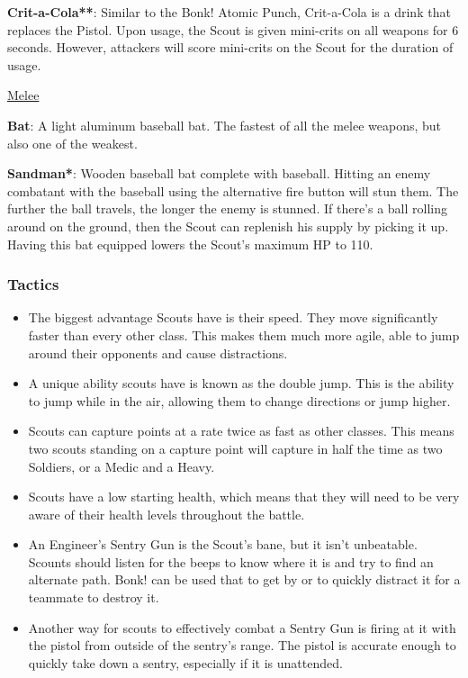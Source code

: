 {\bf Crit-a-Cola**}: Similar to the Bonk! Atomic Punch, Crit-a-Cola is a drink that replaces the Pistol.  Upon usage, the Scout is given mini-crits on all weapons for 6 seconds.  However, attackers will score mini-crits on the Scout for the duration of usage.

\newpage


\begin {center}
\underline {Melee}
\end {center}

{\bf Bat}: A light aluminum baseball bat. The fastest of all the melee weapons, but also one of the weakest.

{\bf Sandman*}: Wooden baseball bat complete with baseball. Hitting an enemy combatant with the baseball using the alternative fire button will stun them. The further the ball travels, the longer the enemy is stunned. If there's a ball rolling around on the ground, then the Scout can replenish his supply by picking it up. Having this bat equipped lowers the Scout’s maximum HP to 110. 

\subsubsection {Tactics}
\begin {itemize}
\item The biggest advantage Scouts have is their speed. They move significantly faster than every other class. This makes them much more agile, able to jump around their opponents and cause distractions.

\item A unique ability scouts have is known as the double jump.  This is the ability to jump while in the air, allowing them to change directions or jump higher.

\item Scouts can capture points at a rate twice as fast as other classes.  This means two scouts standing on a capture point will capture in half the time as two Soldiers, or a Medic and a Heavy.

\item Scouts have a low starting health, which means that they will need to be very aware of their health levels throughout the battle.  

\item An Engineer's Sentry Gun is the Scout's bane, but it isn't unbeatable. Scounts should listen for the beeps to know where it is and try to find an alternate path. Bonk! can be used that to get by or to quickly distract it for a teammate to destroy it.

\item Another way for scouts to effectively combat a Sentry Gun is firing at it with the pistol from outside of the sentry's range. The pistol is accurate enough to quickly take down a sentry, especially if it is unattended.
\end {itemize}